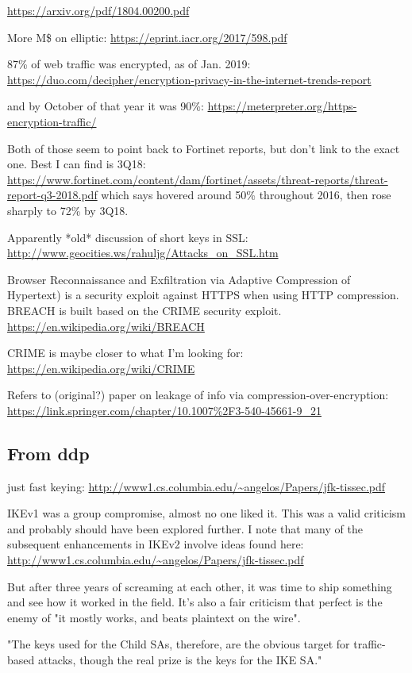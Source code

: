 \documentclass[%
 aip,
 jmp,%
 amsmath,amssymb,
 reprint,%
]{revtex4-1}
\begin{document}
\url{https://arxiv.org/pdf/1804.00200.pdf}

More M\$ on elliptic:
\url{https://eprint.iacr.org/2017/598.pdf}

87\% of web traffic was encrypted, as of Jan. 2019:
\url{https://duo.com/decipher/encryption-privacy-in-the-internet-trends-report}

and by October of that year it was 90\%:
\url{https://meterpreter.org/https-encryption-traffic/}

Both of those seem to point back to Fortinet reports, but don't link
to the exact one.  Best I can find is 3Q18:
\url{https://www.fortinet.com/content/dam/fortinet/assets/threat-reports/threat-report-q3-2018.pdf}
which says hovered around 50\% throughout 2016, then rose sharply to
72\% by 3Q18.

Apparently *old* discussion of short keys in SSL:
\url{http://www.geocities.ws/rahuljg/Attacks_on_SSL.htm}

Browser Reconnaissance and Exfiltration via Adaptive Compression of
Hypertext) is a security exploit against HTTPS when using HTTP
compression. BREACH is built based on the CRIME security exploit.
\url{https://en.wikipedia.org/wiki/BREACH}

CRIME is maybe closer to what I'm looking for:
\url{https://en.wikipedia.org/wiki/CRIME}

Refers to (original?) paper on leakage of info via
compression-over-encryption:
\url{https://link.springer.com/chapter/10.1007%2F3-540-45661-9_21}


\subsection{From ddp}

just fast keying:
\url{http://www1.cs.columbia.edu/~angelos/Papers/jfk-tissec.pdf}

IKEv1 was a group compromise, almost no one liked it.  This was a valid criticism and probably should have been explored further.  I note that many of the subsequent enhancements in IKEv2 involve ideas found here:
\url{http://www1.cs.columbia.edu/~angelos/Papers/jfk-tissec.pdf}

But after three years of screaming at each other, it was time to ship
something and see how it worked in the field.  It's also a fair
criticism that perfect is the enemy of "it mostly works, and beats
plaintext on the wire".

"The keys used for the Child SAs, therefore, are the obvious target for traffic-based attacks, though the real prize is the keys for the IKE SA."
\end{document}
